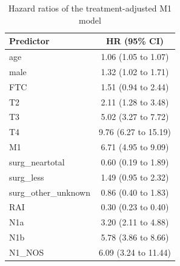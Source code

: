 \begin{table}[htbp]
\caption{Hazard ratios of the treatment-adjusted M1 model}\label{tab:s12_treatment_model_hr}
\scriptsize
\begin{tabular*}{\textwidth}{@{\extracolsep{\fill}}lc@{}}
\toprule
Predictor & HR (95\% CI) \\
\midrule
age & 1.06 (1.05 to 1.07) \\
male & 1.32 (1.02 to 1.71) \\
FTC & 1.51 (0.94 to 2.44) \\
T2 & 2.11 (1.28 to 3.48) \\
T3 & 5.02 (3.27 to 7.72) \\
T4 & 9.76 (6.27 to 15.19) \\
M1 & 6.71 (4.95 to 9.09) \\
surg\_neartotal & 0.60 (0.19 to 1.89) \\
surg\_less & 1.49 (0.95 to 2.32) \\
surg\_other\_unknown & 0.86 (0.40 to 1.83) \\
RAI & 0.30 (0.23 to 0.40) \\
N1a & 3.20 (2.11 to 4.88) \\
N1b & 5.78 (3.86 to 8.66) \\
N1\_NOS & 6.09 (3.24 to 11.44) \\
\bottomrule
\end{tabular*}
\smallskip{}
\end{table}
